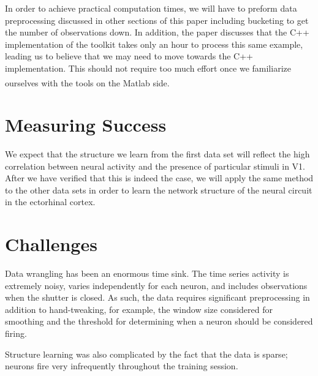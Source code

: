 \documentclass{article}
\begin{document}
In order to achieve practical computation times, we will have to preform data 
preprocessing discussed in other sections of this paper including bucketing to 
get the number of observations down. In addition, the paper discusses that the 
C++ implementation of the toolkit takes only an hour to process this same 
example, leading us to believe that we may need to move towards the C++ 
implementation. This should not require too much effort once we familiarize 
ourselves with the tools on the Matlab\textsuperscript{\textregistered} 
side.\par 

\section*{Measuring Success}


We expect that the structure we learn from the first data set will reflect the 
high correlation between neural activity and the presence of particular 
stimuli in V1. After we have verified that this is indeed the case, we will 
apply the same method to the other data sets in order to learn the network 
structure of the neural circuit in the ectorhinal cortex. \par


\section*{Challenges}

Data wrangling has been an enormous time sink. The time series activity is 
extremely noisy, varies independently for each neuron, and includes 
observations when the shutter is closed. As such, the data requires 
significant preprocessing in addition to hand-tweaking, for example, the 
window size considered for smoothing and the threshold for determining when a 
neuron should be considered firing. \par

Structure learning was also complicated by the fact that the data is sparse; 
neurons fire very infrequently throughout the training session.\par



\end{document}
